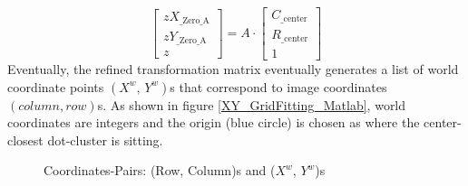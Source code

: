 %
\begin{equation}
%
\left[ \begin{array}{c} %
zX_{\text{\_Zero\_A}} \\ zY_{\text{\_Zero\_A}} \\ z \end{array} \right] %
= %
A\cdot \left[ \begin{array}{c} %
C_{\text{\_center}} \\ R_{\text{\_center}} \\ 1 \end{array} \right] %
%
\end{equation}%
%
Eventually, the refined transformation matrix eventually generates a list of world coordinate points \((X^w, \, Y^w)\)s that correspond to image coordinates \((column, row)\)s. As shown in figure \ref{XY_GridFitting_Matlab}, world coordinates are integers and the origin (blue circle) is chosen as where the center-closest dot-cluster is sitting.\par%
%
 \begin{figure}[h]
\hspace*{-0.3cm}
\centering
{}
{}
%
\caption{Coordinates-Pairs: (Row, Column)s and (\(X^w\), \(Y^w\))s}
\label{Grid_Fitting}
\end{figure}%
%
%
